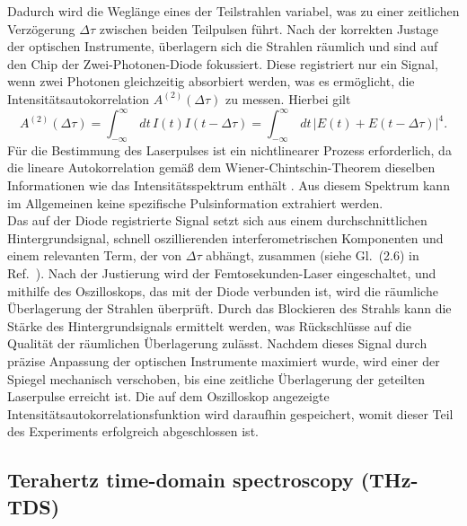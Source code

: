 Dadurch wird die Weglänge eines der Teilstrahlen variabel, was zu einer zeitlichen Verzögerung 
$\Delta\tau$ zwischen beiden Teilpulsen führt. 
Nach der korrekten Justage der optischen Instrumente, überlagern sich die Strahlen räumlich und sind 
auf den Chip der Zwei-Photonen-Diode fokussiert. 
Diese registriert nur ein Signal, wenn zwei Photonen gleichzeitig absorbiert werden, 
was es ermöglicht, die Intensitätsautokorrelation $A^{(2)}(\Delta\tau)$ zu messen. Hierbei gilt
\begin{equation}
    A^{(2)}(\Delta\tau) = \int_{-\infty}^{\infty}\,dt\,I(t)I(t-\Delta\tau) = \int_{-\infty}^{\infty}\,dt\,\left\vert E(t) + E(t-\Delta\tau) \right\vert^{4}.
\end{equation}  
Für die Bestimmung des Laserpulses ist ein nichtlinearer Prozess erforderlich, da die lineare 
Autokorrelation gemäß dem Wiener-Chintschin-Theorem dieselben Informationen wie das Intensitätsspektrum enthält \cite{Anleitung}. 
Aus diesem Spektrum kann im Allgemeinen keine spezifische Pulsinformation extrahiert werden. \\
Das auf der Diode registrierte Signal setzt sich aus einem durchschnittlichen Hintergrundsignal, 
schnell oszillierenden interferometrischen Komponenten und einem relevanten Term, der von $\Delta\tau$ abhängt, 
zusammen (siehe Gl.~(2.6) in Ref.~\cite{Anleitung}). 
Nach der Justierung wird der Femtosekunden-Laser eingeschaltet, und mithilfe des Oszilloskops, 
das mit der Diode verbunden ist, wird die räumliche Überlagerung der Strahlen überprüft. 
Durch das Blockieren des Strahls kann die Stärke des Hintergrundsignals ermittelt werden, 
was Rückschlüsse auf die Qualität der räumlichen Überlagerung zulässt. 
Nachdem dieses Signal durch präzise Anpassung der optischen Instrumente maximiert wurde, 
wird einer der Spiegel mechanisch verschoben, bis eine zeitliche Überlagerung der geteilten Laserpulse 
erreicht ist. 
Die auf dem Oszilloskop angezeigte Intensitätsautokorrelationsfunktion wird daraufhin gespeichert, 
womit dieser Teil des Experiments erfolgreich abgeschlossen ist.\\

\subsection{Terahertz time-domain spectroscopy (THz-TDS)}
